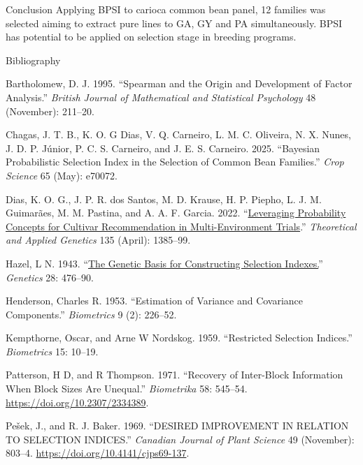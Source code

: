 \documentclass[
  ignorenonframetext,
  aspectratio=169,
]{beamer}
\newlength{\cslhangindent}
\newenvironment{CSLReferences}[2] %
 {\begin{list}{}{%
  \setlength{\itemindent}{0pt}
  \setlength{\leftmargin}{0pt}
  \setlength{\parsep}{0pt}
  \ifodd #1
   \setlength{\leftmargin}{\cslhangindent}
   \setlength{\itemindent}{-1\cslhangindent}
  \fi
  \setlength{\itemsep}{#2\baselineskip}}}
 {\end{list}}
\begin{document}
\begin{frame}{Conclusion}
\label{conclusion}
Applying BPSI to carioca common bean panel, 12 families was selected
aiming to extract pure lines to GA, GY and PA simultaneously. BPSI has
potential to be applied on selection stage in breeding programs.
\end{frame}

\begin{frame}{Bibliography}
\label{bibliography}
\label{refs}
\begin{CSLReferences}{1}{0}
Bartholomew, D. J. 1995. {``Spearman and the Origin and Development of
Factor Analysis.''} \emph{British Journal of Mathematical and
Statistical Psychology} 48 (November): 211--20.

Chagas, J. T. B., K. O. G Dias, V. Q. Carneiro, L. M. C. Oliveira, N. X.
Nunes, J. D. P. Júnior, P. C. S. Carneiro, and J. E. S. Carneiro. 2025.
{``Bayesian Probabilistic Selection Index in the Selection of Common
Bean Families.''} \emph{Crop Science} 65 (May): e70072.

Dias, K. O. G., J. P. R. dos Santos, M. D. Krause, H. P. Piepho, L. J.
M. Guimarães, M. M. Pastina, and A. A. F. Garcia. 2022.
{``\href{https://www.ncbi.nlm.nih.gov/pubmed/35192008}{Leveraging
Probability Concepts for Cultivar Recommendation in Multi-Environment
Trials}.''} \emph{Theoretical and Applied Genetics} 135 (April):
1385--99.

Hazel, L N. 1943.
{``\href{https://www.ncbi.nlm.nih.gov/pubmed/17247099}{The Genetic Basis
for Constructing Selection Indexes.}''} \emph{Genetics} 28: 476--90.

Henderson, Charles R. 1953. {``Estimation of Variance and Covariance
Components.''} \emph{Biometrics} 9 (2): 226--52.

Kempthorne, Oscar, and Arne W Nordskog. 1959. {``Restricted Selection
Indices.''} \emph{Biometrics} 15: 10--19.

Patterson, H D, and R Thompson. 1971. {``Recovery of Inter-Block
Information When Block Sizes Are Unequal.''} \emph{Biometrika} 58:
545--54. \url{https://doi.org/10.2307/2334389}.

Pešek, J., and R. J. Baker. 1969. {``DESIRED IMPROVEMENT IN RELATION TO
SELECTION INDICES.''} \emph{Canadian Journal of Plant Science} 49
(November): 803--4. \url{https://doi.org/10.4141/cjps69-137}.


\end{CSLReferences}
\end{frame}
\end{document}

